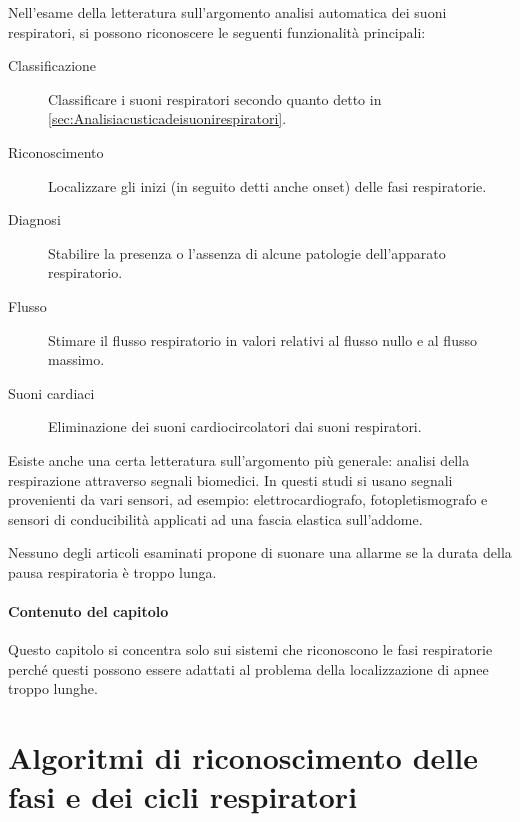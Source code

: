 

Nell'esame della letteratura sull'argomento analisi automatica dei suoni respiratori, si possono riconoscere le seguenti funzionalit\`a principali:
\begin{description}
  \item[Classificazione]
    Classificare i suoni respiratori secondo quanto detto in \ref{sec:Analisiacusticadeisuonirespiratori}.
  \item[Riconoscimento]
    Localizzare gli inizi (in seguito detti anche onset) delle fasi respiratorie.
  \item[Diagnosi]
    Stabilire la presenza o l'assenza di alcune patologie dell'apparato respiratorio.
  \item[Flusso]
    Stimare il flusso respiratorio in valori relativi al flusso nullo e al flusso massimo.
  \item[Suoni cardiaci]
    Eliminazione dei suoni cardiocircolatori dai suoni respiratori.
\end{description}

Esiste anche una certa letteratura sull'argomento pi\`u generale: analisi della respirazione attraverso segnali biomedici. In questi studi si usano segnali provenienti da vari sensori, ad esempio: elettrocardiografo, fotopletismografo e sensori di conducibilit\`a applicati ad una fascia elastica sull'addome.


Nessuno degli articoli esaminati propone di suonare una allarme se la durata della pausa respiratoria \`e troppo lunga.


\paragraph{Contenuto del capitolo}
Questo capitolo si concentra solo sui sistemi che riconoscono le fasi respiratorie perch\'e questi possono essere adattati al problema della localizzazione di apnee troppo lunghe.





 
% 
% 
% 


\section{Algoritmi di riconoscimento delle fasi e dei cicli respiratori}%


